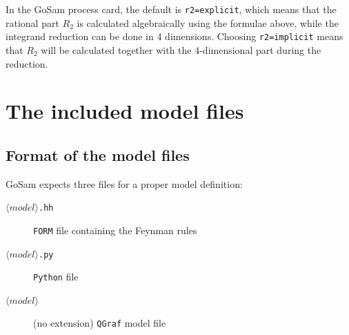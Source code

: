 \documentclass[11pt,a4paper]{refrep}
\newcommand{\gosamversion}{{2{.}0}}
\newcommand{\gosam}{{\sc GoSam}\xspace}
\newcommand{\gosamv}[1][\gosamversion]{{\sc GoSam}\xspace}
\newcommand{\qgraf}{{\tt QGraf}\xspace}
\newcommand{\form}{{\tt FORM}\xspace}
\newcommand{\python}{{\tt Python}\xspace}
\begin{document}
In the \gosam{} process card, the default is {\tt r2=explicit}, which means that 
the rational part $R_2$ is calculated algebraically using the formulae above, 
while the integrand reduction can be done in 4 dimensions.
Choosing {\tt r2=implicit} means that $R_2$ will be calculated together with the 4-dimensional 
part during the reduction.

\chapter{The included model files}
\label{chp:model-files}



\section{Format of the model files}\label{sec:modelfiles}
\gosamv{} expects three files for a proper model definition:
\begin{description}
\item[$\langle model\rangle$\texttt{.hh}] \form{} file containing the Feynman rules
\item[$\langle model\rangle$\texttt{.py}] \python{} file
\item[$\langle model\rangle$] (no extension) \qgraf{} model file
\end{description}
\end{document}
